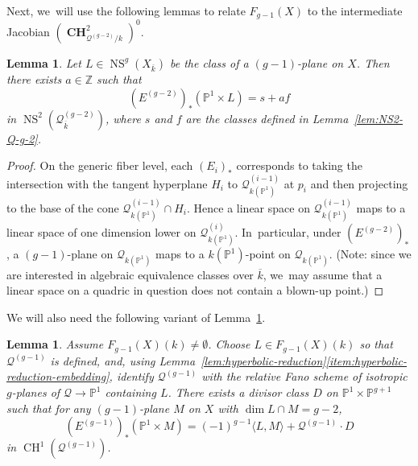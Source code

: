 \documentclass[JEP,XML,SOM,Unicode,NoEqCountersInSection,published]{cedram}
\theoremstyle{plain}
\newtheorem{lem}[thm]{Lemma}
\theoremstyle{definition}
\DeclareMathOperator{\CH}{CH}
\DeclareMathOperator{\bCH}{\mathbf{CH}}
\DeclareMathOperator{\NS}{NS}
\newcommand{\kbar}{{\overline{k}}}
\renewcommand\P{\mathbb{P}}
\newcommand\Z{\mathbb{Z}}
\begin{document}
Next, we~will use the following lemmas to relate \(F_{g-1}(X)\) to the intermediate Jacobian \((\bCH^2_{\mathcal{Q}^{(g-2)}/k})^0\).

\begin{lem}\label{lem:L-to-section}
Let $L \in \NS^g(X_{\kbar})$ be the class of a $(g-1)$-plane on $X$.
Then there exists $a\in \Z$ such that
\[
(E^{(g-2)})_*(\P^1\times L) = s+af
\]
in $\NS^2(\mathcal{Q}^{(g-2)}_{\kbar})$, where \(s\) and \(f\) are the classes defined in Lemma~\ref{lem:NS2-Q-g-2}.
\end{lem}

\begin{proof}
On the generic fiber level, each $(E_i)_*$ corresponds to taking the intersection with the tangent hyperplane $H_i$ to $\mathcal{Q}^{(i-1)}_{k(\P^1)}$ at $p_i$ and then projecting to the base of the cone $\mathcal{Q}^{(i-1)}_{k(\P^1)}\cap H_i$.
Hence a linear space on $\mathcal{Q}^{(i-1)}_{k(\P^1)}$ maps to a linear space of one dimension lower on $\mathcal{Q}^{(i)}_{k(\P^1)}$. In~particular, under $(E^{(g-2)})_*$, a $(g-1)$-plane on $\mathcal{Q}_{k(\P^1)}$ maps to a $k(\P^1)$-point on $\mathcal{Q}_{k(\P^1)}$.
(Note: since we are interested in algebraic equivalence classes over $\kbar$, we~may assume that a linear space on a quadric in question does not contain a blown-up point.)
\end{proof}

We will also need the following variant of Lemma~\ref{lem:L-to-section}.

\begin{lem}\label{lem:L-to-point}
Assume $F_{g-1}(X)(k)\neq\emptyset$. Choose $L\in F_{g-1}(X)(k)$ so that $\mathcal{Q}^{(g-1)}$ is defined, and, using Lemma~\ref{lem:hyperbolic-reduction}\eqref{item:hyperbolic-reduction-embedding},
identify $\mathcal{Q}^{(g-1)}$ with
the relative Fano scheme of isotropic $g$-planes of $\mathcal{Q}\to \P^1$ containing $L$.
There exists a divisor class \(D\) on $\P^1\times \P^{g+1}$ such that for any $(g-1)$-plane $M$ on $X$ with $\dim L\cap M=g-2$,
\[
(E^{(g-1)})_*(\P^1\times M) = (-1)^{g-1}\langle L, M\rangle + \mathcal{Q}^{(g-1)}\cdot D
\]
in $\CH^1(\mathcal{Q}^{(g-1)})$.
\end{lem}
\end{document}
